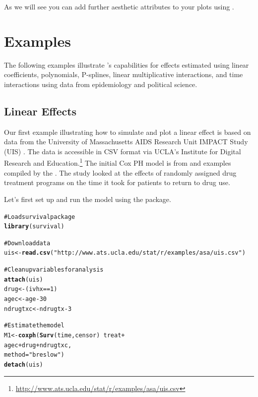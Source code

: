 \documentclass[nojss]{jss}\usepackage{graphicx, color}
\makeatletter
\newcommand{\hlfunctioncall}[1]{\textcolor[rgb]{0.501960784313725,0,0.329411764705882}{\textbf{#1}}}%
\newcommand{\hlstring}[1]{\textcolor[rgb]{0.6,0.6,1}{#1}}%
\newcommand{\hlcomment}[1]{\textcolor[rgb]{0.180392156862745,0.6,0.341176470588235}{#1}}%
\newenvironment{kframe}{%
 \def\at@end@of@kframe{}%
 \ifinner\ifhmode%
  \def\at@end@of@kframe{\end{minipage}}%
  \begin{minipage}{\columnwidth}%
 \fi\fi%
 \def\FrameCommand##1{\hskip\@totalleftmargin \hskip-\fboxsep
 \colorbox{shadecolor}{##1}\hskip-\fboxsep
     \hskip-\linewidth \hskip-\@totalleftmargin \hskip\columnwidth}%
 \MakeFramed {\advance\hsize-\width
   \@totalleftmargin\z@ \linewidth\hsize
   \@setminipage}}%
 {\par\unskip\endMakeFramed%
 \at@end@of@kframe}
\newenvironment{knitrout}{}{} %
\makeatother
\begin{document}
\noindent As we will see you can add further aesthetic attributes to your  plots using .

\section{Examples}

The following examples illustrate 's capabilities for effects estimated using linear coefficients, polynomials, P-splines, linear multiplicative interactions, and time interactions using data from epidemiology and political science.

\subsection{Linear Effects}

Our first example illustrating how to simulate and plot a linear effect is based on data from the University of Massachusetts AIDS Research Unit IMPACT Study (UIS) \cite[see][10]{HosmerEtAl2008}. The data is accessible in CSV format via UCLA's Institute for Digital Research and Education.\footnote{\url{http://www.ats.ucla.edu/stat/r/examples/asa/uis.csv}} The initial Cox PH model is from \cite{HosmerEtAl2008} and examples compiled by the \cite{UIS2013}. The study looked at the effects of randomly assigned drug treatment programs on the time it took for patients to return to drug use. 

Let's first set up and run the model using the  package. 

\begin{knitrout}
\color{fgcolor}\begin{kframe}
\begin{alltt}
\hlcomment{# Load survival package}
\hlfunctioncall{library}(survival)

\hlcomment{# Download data }
uis <- \hlfunctioncall{read.csv}(\hlstring{"http://www.ats.ucla.edu/stat/r/examples/asa/uis.csv"})

\hlcomment{# Clean up variables for analysis}
\hlfunctioncall{attach}(uis)
	drug <- (ivhx == 1)
	agec <- age - 30
	ndrugtxc <- ndrugtx - 3

\hlcomment{	# Estimate the model}
	M1 <- \hlfunctioncall{coxph}(\hlfunctioncall{Surv}(time, censor) ~ treat + 
				agec + drug + ndrugtxc, 
				method=\hlstring{"breslow"})
\hlfunctioncall{detach}(uis)
\end{alltt}
\end{kframe}
\end{knitrout}
\end{document}
